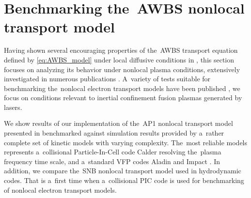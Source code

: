 \section{Benchmarking the~AWBS nonlocal transport model}
\label{sec:BenchmarkingAWBS}
Having shown several encouraging properties of the~AWBS transport 
equation defined by \eqref{eq:AWBS_model} under local diffusive conditions
in , this section focuses on analyzing 
its behavior under nonlocal plasma conditions, extensively investigated 
in numerous publications 
\cite{Malone_1975_15, Colombant_PoP2005, Bell_1981_83, LMV_1983_7, Brantov_Nonlocal_electron_transport_1998, schurtz2000, Sorbo_2015}.
A~variety of tests suitable for benchmarking the~nonlocal electron 
transport models have been published 
\cite{Epperlein_PoFB1991, marocchino2013, Sorbo_2015, 
Sorbo_2016, Sherlock_PoP2017, Brodrick_PoP2017}, we focus on 
conditions relevant to inertial confinement fusion plasmas generated by lasers.

We show results of our implementation of the~AP1 nonlocal transport model 
presented in  benchmarked against simulation results 
provided by a~rather complete set of kinetic models with varying complexity. 
The~most reliable models represents a~collisional Particle-In-Cell
code Calder \cite{Lefebvre_NF2003, Perez_PoP2012} resolving 
the~plasma frequency time scale, and a~standard VFP codes
Aladin and Impact \cite{Kingham_JCP2004}.
In addition, we compare the~SNB nonlocal transport model \cite{Schurtz_2000} 
used in hydrodynamic codes. 
That is a~first time when a~collisional PIC code is used
for benchmarking of nonlocal electron transport models. 


